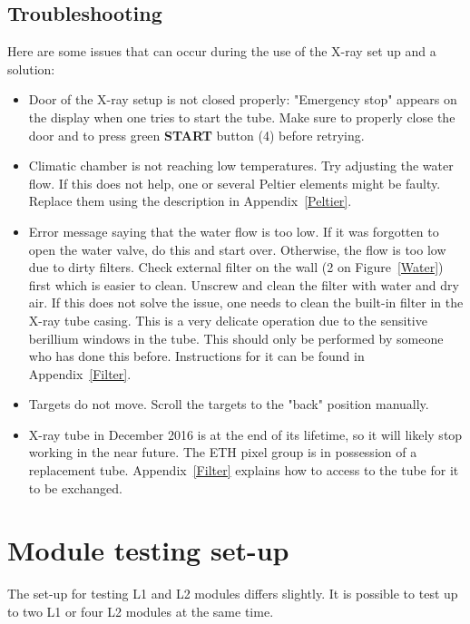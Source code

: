 \documentclass[a4paper,12pt,twoside]{article}
\begin{document}
\subsection{Troubleshooting}
Here are some issues that can occur during the use of the X-ray set up and a solution:
\begin{itemize}
\item Door of the X-ray setup is not closed properly: "Emergency stop" appears on the display when one tries to start the tube. Make sure to properly close the door and to press green \textbf{START} button (4) before retrying.
\item Climatic chamber is not reaching low temperatures. Try adjusting the water flow. If this does not help, one or several Peltier elements might be faulty. Replace them using the description in Appendix~\ref{Peltier}.
\item Error message saying that the water flow is too low. If it was forgotten to open the water valve, do this and start over. Otherwise, the flow is too low due to dirty filters. Check external filter on the wall (2 on Figure~\ref{Water}) first which is easier to clean. Unscrew and clean the filter with water and dry air. If this does not solve the issue, one needs to clean the built-in filter in the X-ray tube casing. This is a very delicate operation due to the sensitive berillium windows in the tube. This should only be performed by someone who has done this before. Instructions for it can be found in Appendix~\ref{Filter}.
\item Targets do not move. Scroll the targets to the "back" position manually.
\item X-ray tube in December 2016 is at the end of its lifetime, so it will likely stop working in the near future. The ETH pixel group is in possession of a replacement tube. Appendix~\ref{Filter} explains how to access to the tube for it to be exchanged. 
\end{itemize}


\section{Module testing set-up}

The set-up for testing L1 and L2 modules differs slightly. It is possible to test up to two L1 or four L2 modules at the same time.
\end{document}

